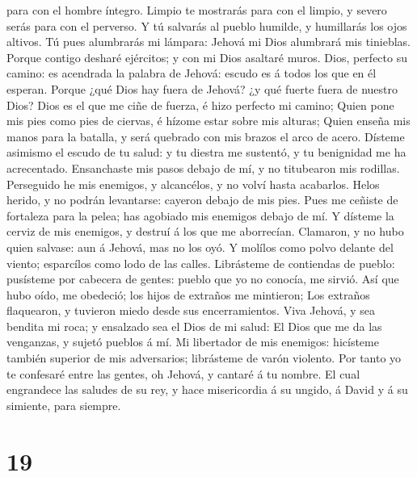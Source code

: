 para con el hombre íntegro.  Limpio te mostrarás para con
el limpio, y severo serás para con el perverso.  Y tú
salvarás al pueblo humilde, y humillarás los ojos altivos. 
Tú pues alumbrarás mi lámpara: Jehová mi Dios alumbrará mis tinieblas.
 Porque contigo desharé ejércitos; y con mi Dios asaltaré
muros.  Dios, perfecto su camino: es acendrada la palabra
de Jehová: escudo es á todos los que en él esperan.  Porque
¿qué Dios hay fuera de Jehová? ¿y qué fuerte fuera de nuestro Dios?
 Dios es el que me ciñe de fuerza, é hizo perfecto mi
camino;  Quien pone mis pies como pies de ciervas, é hízome
estar sobre mis alturas;  Quien enseña mis manos para la
batalla, y será quebrado con mis brazos el arco de acero. 
Dísteme asimismo el escudo de tu salud: y tu diestra me sustentó, y tu
benignidad me ha acrecentado.  Ensanchaste mis pasos debajo
de mí, y no titubearon mis rodillas.  Perseguido he mis
enemigos, y alcancélos, y no volví hasta acabarlos.  Helos
herido, y no podrán levantarse: cayeron debajo de mis pies.
 Pues me ceñiste de fortaleza para la pelea; has agobiado
mis enemigos debajo de mí.  Y dísteme la cerviz de mis
enemigos, y destruí á los que me aborrecían.  Clamaron, y
no hubo quien salvase: aun á Jehová, mas no los oyó.  Y
molílos como polvo delante del viento; esparcílos como lodo de las
calles.  Librásteme de contiendas de pueblo: pusísteme por
cabecera de gentes: pueblo que yo no conocía, me sirvió. 
Así que hubo oído, me obedeció; los hijos de extraños me mintieron;
 Los extraños flaquearon, y tuvieron miedo desde sus
encerramientos.  Viva Jehová, y sea bendita mi roca; y
ensalzado sea el Dios de mi salud:  El Dios que me da las
venganzas, y sujetó pueblos á mí.  Mi libertador de mis
enemigos: hicísteme también superior de mis adversarios; librásteme de
varón violento.  Por tanto yo te confesaré entre las
gentes, oh Jehová, y cantaré á tu nombre.  El cual
engrandece las saludes de su rey, y hace misericordia á su ungido, á
David y á su simiente, para siempre.

\hypertarget{section-18}{%
\section{19}\label{section-18}}

